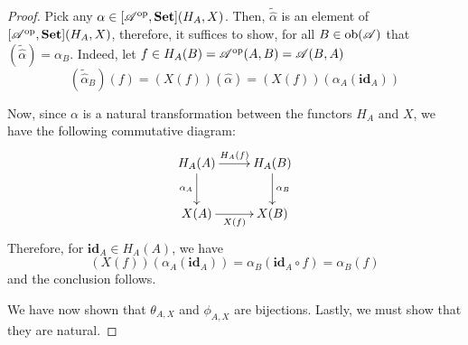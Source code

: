 \begin{proof}
Pick any $\alpha\in[\mathscr{A}^{\text{op}},\mathbf{Set}](H_A,X)$. Then, $\widetilde{\widehat{\alpha}}$ is an element of $[\mathscr{A}^{\text{op}},\mathbf{Set}](H_A,X)$, therefore, it suffices to show, for all $B\in\operatorname{ob}(\mathscr{A})$ that $(\widetilde{\widehat{\alpha}}) = \alpha_B$. Indeed, let $f\in H_A(B) = \mathscr{A}^{\text{op}}(A,B) = \mathscr{A}(B,A)$
\begin{equation*}
    (\widetilde{\widehat{\alpha}}_B)(f) = (X(f))(\widehat{\alpha}) = (X(f))(\alpha_A(\mathbf{id}_A))
\end{equation*}

Now, since $\alpha$ is a natural transformation between the functors $H_A$ and $X$, we have the following commutative diagram:
\begin{equation*}
\xymatrix{
    H_A(A)\ar[r]^{H_A(f)}\ar[d]_{\alpha_A} & H_A(B)\ar[d]^{\alpha_B}\\
    X(A)\ar[r]_{X(f)} & X(B)
}
\end{equation*}
Therefore, for $\mathbf{id}_A\in H_A(A)$, we have 
\begin{equation*}
    (X(f))(\alpha_A(\mathbf{id}_A)) = \alpha_B(\mathbf{id}_A\circ f) = \alpha_B(f)
\end{equation*}
and the conclusion follows.

We have now shown that $\theta_{A,X}$ and $\phi_{A,X}$ are bijections. Lastly, we must show that they are natural. 
\end{proof}